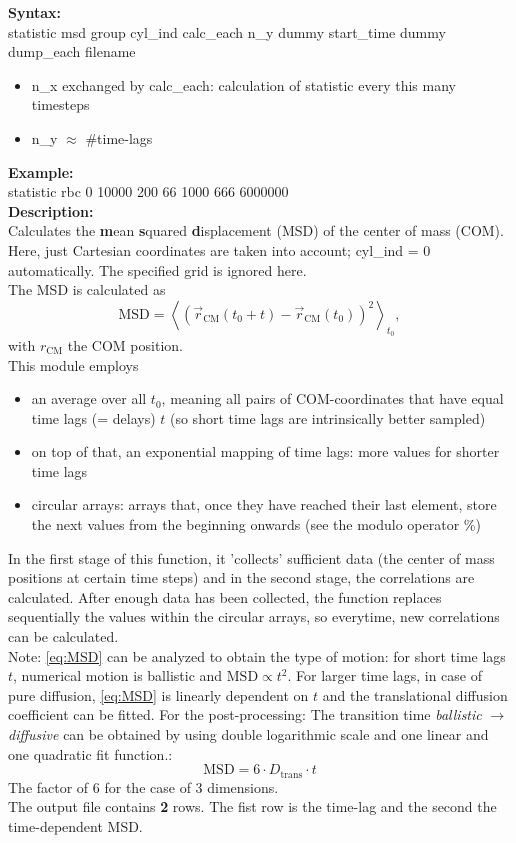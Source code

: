 \documentclass[a4paper,10pt]{scrreprt}
\begin{document}
\textbf{Syntax:}\
\\[0.5ex]
statistic	msd group cyl\_ind calc\_each n\_y dummy start\_time dummy dump\_each filename
\begin{itemize}
\item n\_x exchanged by calc\_each: calculation of statistic every this many timesteps
\item n\_y $\approx$ \#time-lags
\end{itemize} 
\textbf{Example:}
\\[0.5ex]
statistic rbc 0 10000 200 66 1000 666 6000000
\\[2ex]
\textbf{Description:}
\\[0.5ex]
Calculates the \textbf{m}ean \textbf{s}quared \textbf{d}isplacement (MSD) of the center of mass (COM).
\\[2ex]
Here, just Cartesian coordinates are taken into account; cyl\_ind = 0 automatically.
The specified grid is ignored here.\\
The MSD is calculated as
%
\begin{equation}
\mathrm{MSD} = \left \langle \left ( \vec{r}_\mathrm{CM}(t_0 + t) - \vec{r}_\mathrm{CM}(t_0) \right ) ^2 \right \rangle _{t_0},
\label{eq:MSD}
\end{equation}
%
with $r_\mathrm{CM}$ the COM position.
\\[2ex]
This module employs
%
\begin{itemize}
\item an average over all $t_0$, meaning all pairs of COM-coordinates that have equal time lags (= delays) $t$ (so short time lags are intrinsically better sampled)
\item on top of that, an exponential mapping of time lags: more values for shorter time lags
\item circular arrays: arrays that, once they have reached their last element, store the next values from the beginning onwards (see the modulo operator \%)
\end{itemize}
%
In the first stage of this function, it 'collects' sufficient data (the center of mass positions at certain time steps) and in the second stage, the correlations are calculated. After enough data has been collected, the function replaces sequentially the values within the circular arrays, so everytime, new correlations can be calculated.
\\[2ex]
Note: \cref{eq:MSD} can be analyzed to obtain the type of motion: for short time lags $t$, numerical motion is ballistic and $\mathrm{MSD} \propto t^2$.
For larger time lags, in case of pure diffusion, \cref{eq:MSD} is linearly dependent on $t$ and the translational diffusion coefficient can be fitted.
For the post-processing: The transition time \textit{ballistic} $\longrightarrow$ \textit{diffusive} can be obtained by using double logarithmic scale and one linear and one quadratic fit function.:
%
\begin{equation}
\mathrm{MSD} = 6 \cdot D_{\mathrm{trans}} \cdot t
\label{MSD_diffusion}
\end{equation}
%
The factor of 6 for the case of 3 dimensions.
\\[2ex]
The output file contains {\bfseries 2} rows.
The fist row is the time-lag and the second the time-dependent MSD.
\end{document}
